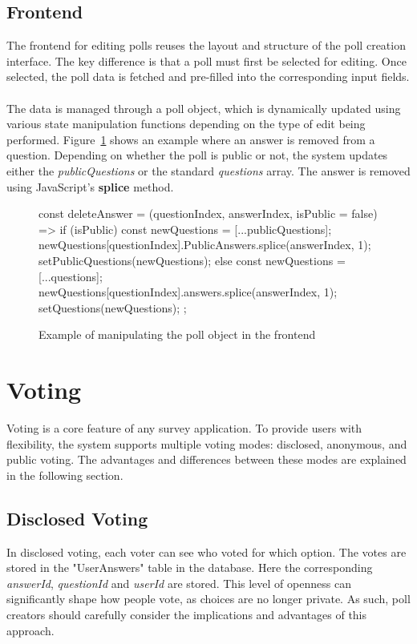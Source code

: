 \documentclass[a4paper,12pt]{report}
\begin{document}
\subsection{Frontend}
The frontend for editing polls reuses the layout and structure of the poll creation interface. The key difference is that a poll must first be selected for editing. Once selected, the poll data is fetched and pre-filled into the corresponding input fields. \\ \\
The data is managed through a poll object, which is dynamically updated using various state manipulation functions depending on the type of edit being performed. Figure~\ref{fig:editing} shows an example where an answer is removed from a question. Depending on whether the poll is public or not, the system updates either the \textit{publicQuestions} or the standard \textit{questions} array. The answer is removed using JavaScript’s \textbf{splice} method.

\begin{figure}[H]
	\begin{code}
		const deleteAnswer = (questionIndex, answerIndex, isPublic = false) => {
			if (isPublic) {
				const newQuestions = [...publicQuestions];
				newQuestions[questionIndex].PublicAnswers.splice(answerIndex, 1);
				setPublicQuestions(newQuestions);
			} else {
				const newQuestions = [...questions];
				newQuestions[questionIndex].answers.splice(answerIndex, 1);
				setQuestions(newQuestions);
			}
		};
	\end{code}
	\caption{Example of manipulating the poll object in the frontend}
	\label{fig:editing}
\end{figure}

\section{Voting}
Voting is a core feature of any survey application. To provide users with flexibility, the system supports multiple voting modes: disclosed, anonymous, and public voting. The advantages and differences between these modes are explained in the following section. \\
\subsection{Disclosed Voting}
In disclosed voting, each voter can see who voted for which option. The votes are stored in the "UserAnswers" table in the database. Here the corresponding \textit{answerId}, \textit{questionId} and \textit{userId} are stored. This level of openness can significantly shape how people vote, as choices are no longer private. As such, poll creators should carefully consider the implications and advantages of this approach.
\end{document}
